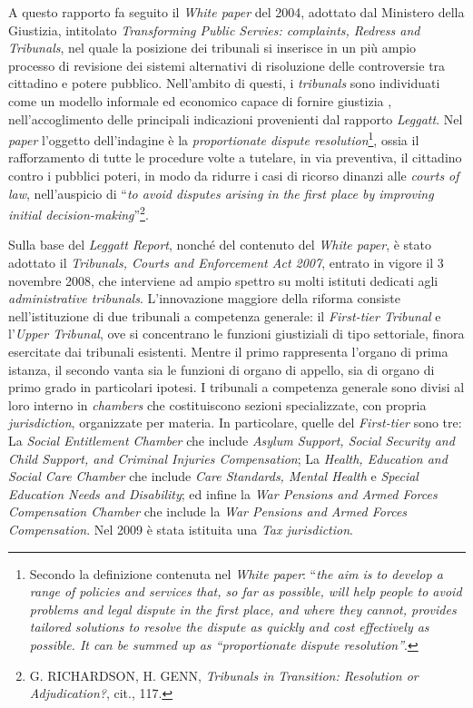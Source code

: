 \documentclass[12pt,it,a4paper,]{report}
\begin{document}
A questo rapporto fa seguito il \emph{White paper} del 2004, adottato
dal Ministero della Giustizia, intitolato \emph{Transforming Public
Servies: complaints, Redress and Tribunals}, nel quale la posizione dei
tribunali si inserisce in un più ampio processo di revisione dei sistemi
alternativi di risoluzione delle controversie tra cittadino e potere
pubblico. Nell'ambito di questi, i \emph{tribunals} sono individuati
come un modello informale ed economico capace di fornire giustizia ,
nell'accoglimento delle principali indicazioni provenienti dal rapporto
\emph{Leggatt}. Nel \emph{paper} l'oggetto dell'indagine è la
\emph{proportionate dispute resolution}\footnote{Secondo la definizione
  contenuta nel \emph{White paper}: ``\emph{the aim is to develop a
  range of policies and services that, so far as possible, will help
  people to avoid problems and legal dispute in the first place, and
  where they cannot, provides tailored solutions to resolve the dispute
  as quickly and cost effectively as possible. It can be summed up as
  ``proportionate dispute resolution''}.}, ossia il rafforzamento di
tutte le procedure volte a tutelare, in via preventiva, il cittadino
contro i pubblici poteri, in modo da ridurre i casi di ricorso dinanzi
alle \emph{courts of law}, nell'auspicio di ``\emph{to avoid disputes
arising in the first place by improving initial
decision-making}''\footnote{G. RICHARDSON, H. GENN, \emph{Tribunals in
  Transition: Resolution or Adjudication?}, cit., 117.}.

Sulla base del \emph{Leggatt Report}, nonché del contenuto del
\emph{White paper}, è stato adottato il \emph{Tribunals, Courts and
Enforcement Act 2007}, entrato in vigore il 3 novembre 2008, che
interviene ad ampio spettro su molti istituti dedicati agli
\emph{administrative tribunals}. L'innovazione maggiore della riforma
consiste nell'istituzione di due tribunali a competenza generale: il
\emph{First-tier Tribunal} e l'\emph{Upper Tribunal}, ove si concentrano
le funzioni giustiziali di tipo settoriale, finora esercitate dai
tribunali esistenti. Mentre il primo rappresenta l'organo di prima
istanza, il secondo vanta sia le funzioni di organo di appello, sia di
organo di primo grado in particolari ipotesi. I tribunali a competenza
generale sono divisi al loro interno in \emph{chambers} che
costituiscono sezioni specializzate, con propria \emph{jurisdiction},
organizzate per materia. In particolare, quelle del \emph{First-tier}
sono tre: La \emph{Social Entitlement Chamber} che include \emph{Asylum
Support, Social Security and Child Support, and Criminal Injuries
Compensation}; La \emph{Health, Education and Social Care Chamber} che
include \emph{Care Standards, Mental Health} e \emph{Special Education
Needs and Disability}; ed infine la \emph{War Pensions and Armed Forces
Compensation Chamber} che include la \emph{War Pensions and Armed Forces
Compensation}. Nel 2009 è stata istituita una \emph{Tax jurisdiction}.
\end{document}
